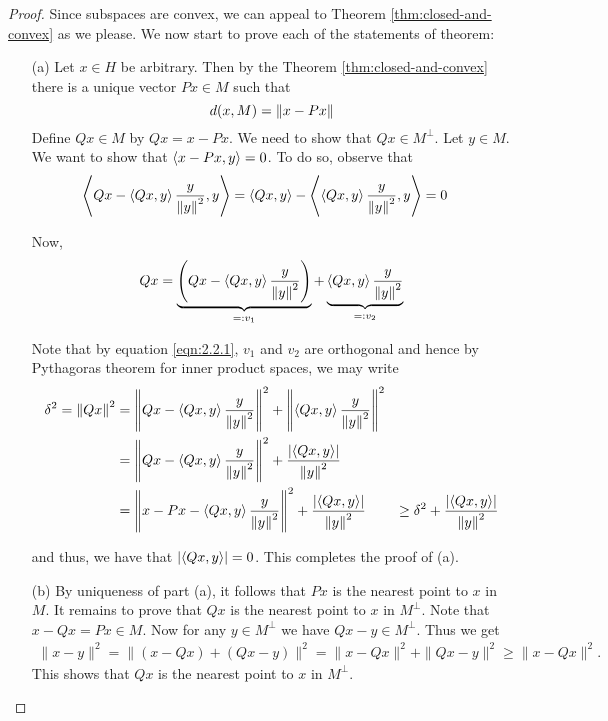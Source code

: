 \begin{proof}
    Since subspaces are convex, we can appeal to Theorem \ref{thm:closed-and-convex} as we please. We now start to prove each of the statements of theorem:
    \begin{itemize}
	\item [(a)] Let $x \in H$ be arbitrary. Then by the Theorem \ref{thm:closed-and-convex} there is a unique vector $Px \in M$ such that 
	    \begin{equation*}
		d(x, M) = \left\lVert x-Px \right\rVert
	    \end{equation*}
	    Define $Qx \in M$ by $Qx = x-Px$. We need to show that $Qx \in M^{\perp}$. Let $y \in M$. We want to show that $\left\langle x-Px , y \right\rangle = 0$. To do so, observe that
	    \begin{align}
		\left\langle Qx - \left\langle Qx,y \right\rangle \frac{y}{\left\lVert y \right\rVert^{2}},y \right\rangle&= \left\langle Qx,y \right\rangle - \left\langle \left\langle Qx,y \right\rangle \frac{y}{\left\lVert y \right\rVert^{2}},y \right\rangle
		=0
		\label{eqn:2.2.1}
	    \end{align}

	    Now, 
	    \begin{align*}
		Qx = \underbrace{\left( Qx - \left\langle Qx, y \right\rangle \frac{y}{\left\lVert y \right\rVert^{2}} \right)}_{=: v_1} + \underbrace{\left\langle Qx,y \right\rangle \frac{y}{\left\lVert y \right\rVert^{2}}}_{=:v_2}
	    \end{align*}

	    Note that by equation \ref{eqn:2.2.1}, $v_1$ and $v_2$ are orthogonal and hence by Pythagoras theorem for inner product spaces, we may write
\begin{align*}
    \delta ^{2} = \left\lVert Qx \right\rVert^{2} &= \left\lVert  Qx - \left\langle Qx, y \right\rangle \frac{y}{\left\lVert y \right\rVert^{2}} \right\rVert^{2} + \left\lVert \left\langle Qx,y \right\rangle \frac{y}{\left\lVert y \right\rVert^{2}} \right\rVert^{2} \\
    &= \left\lVert  Qx - \left\langle Qx, y \right\rangle \frac{y}{\left\lVert y \right\rVert^{2}} \right\rVert^{2} + \frac{\left\lvert \left\langle Qx,y \right\rangle \right\rvert}{\left\lVert y \right\rVert^{2}} \\
    &= \left\lVert  x- Px - \left\langle Qx, y \right\rangle \frac{y}{\left\lVert y \right\rVert^{2}} \right\rVert^{2} + \frac{\left\lvert \left\langle Qx,y \right\rangle \right\rvert}{\left\lVert y \right\rVert^{2}}
    &\ge \delta ^{2} +  \frac{\left\lvert \left\langle Qx,y \right\rangle \right\rvert}{\left\lVert y \right\rVert^{2}}
	    \end{align*}

	    and thus, we have that $\left\lvert \left\langle Qx,y \right\rangle \right\rvert = 0$. This completes the proof of (a).
	\item [(b)] By uniqueness of part (a), it follows that $Px$ is the nearest point to $x$ in $M$. It remains to prove that $Qx$ is the nearest point to $x$ in $M^{\perp}$. Note that $x-Qx=Px\in M.$ Now for any $y\in M^{\perp}$ we have  $Qx-y\in M^{\perp}.$ Thus we get 
	\begin{align*}
	\|x-y\|^2= \|(x-Qx) + (Qx -y)\|^2 = \|x-Qx\|^2 + \|Qx -y\|^2 \geqslant \|x-Qx\|^2.
	\end{align*}
This shows that $Qx$ is the nearest point to $x$ in $M^{\perp}.$	


\end{itemize}
\end{proof}
